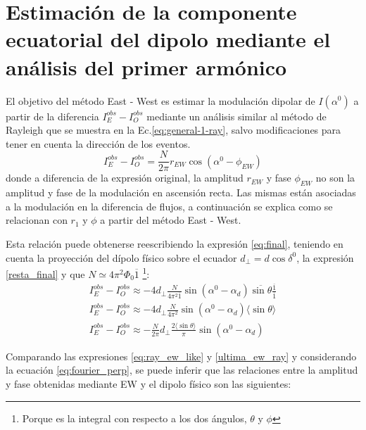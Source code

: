 \section{Estimación de la componente ecuatorial del dipolo mediante el análisis del  primer armónico}


El objetivo del método  East - West es estimar la modulación dipolar de  $I(\alpha^0)$ a partir de la diferencia $I^{obs}_E -  I^{obs}_O$ mediante un análisis similar al método de  Rayleigh que se muestra en la Ec.\ref{eq:general-1-ray}, salvo modificaciones para tener en cuenta la dirección de los eventos. 
\begin{equation}
    I^{obs}_E -  I^{obs}_O = \frac{N}{2\pi} r_{EW} \cos(\alpha^0 -  \phi_{EW}) \label{eq:ray_ew_like}
\end{equation}
donde a diferencia de la expresión original, la amplitud $r_{EW}$ y fase $\phi_{EW}$ no son la amplitud y fase de la modulación en ascensión recta. Las mismas están asociadas a la modulación en la diferencia de flujos, a continuación se explica como se relacionan con $r_1$ y $\phi$  a partir del   método East - West.


Esta relación puede obtenerse reescribiendo la expresión \ref{eq:final}, teniendo en cuenta la proyección del dípolo físico sobre el ecuador $d_{\perp}= d\cos\delta^0$, la expresión  \ref{resta_final} y que $N \simeq 4\pi^2 \Phi_0 \overline{1} $ \footnote{Porque es la integral con respecto a los dos ángulos, $\theta$ y $\phi$}:
\begin{align}
    I^{obs}_E -  I^{obs}_O \approx -4 d_\perp \frac{N}{ 4\pi^2\overline{1}} \sin(\alpha^0  - \alpha_d)\overline{\sin\theta} \frac{\overline{1}}{\overline{1}}\\
    I^{obs}_E -  I^{obs}_O \approx -4 d_\perp \frac{N}{ 4\pi^2} \sin(\alpha^0  - \alpha_d)\langle\sin\theta \rangle\\
    I^{obs}_E -  I^{obs}_O \approx -\frac{N}{2\pi} d_\perp \frac{2\langle\sin\theta \rangle }{\pi}\sin(\alpha^0  - \alpha_d) \label{ultima_ew_ray}
\end{align}


Comparando las expresiones \ref{eq:ray_ew_like} y \ref{ultima_ew_ray} y considerando la ecuación \ref{eq:fourier_perp}, se puede inferir que las relaciones entre la amplitud y fase obtenidas mediante EW y el dipolo físico son las siguientes:

